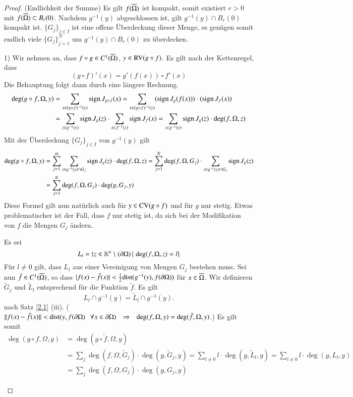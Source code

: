 \begin{proof}
    (Endlichkeit der Summe) Es gilt $f(\overline\Omega)$ ist kompakt, somit existiert $r>0$ mit $f(\overline \Omega)
    \subset B_r(0)$. Nachdem $g^{-1}(y)$ abgeschlossen ist, gilt $g^{-1}(y)\cap B_r(0)$ kompakt ist.
    $\{G_j\}_{j\in I}$ ist eine offene Überdeckung dieser Menge, es genügen somit endlich viele $\{  
    G_j \}_{j=1}^N$ um $g^{-1}(y)\cap B_r(0)$ zu überdecken.
    \begin{description}
    \item{1)}
    Wir nehmen an, dass $f\circ g\in C^1(\overline \Omega)$, $y\in \mathrm{RV}(g\circ f)$. Es gilt nach der
    Kettenregel, dass
    \[
        (g\circ f)'(x)=g'(f(x))\circ f'(x)
    \]
    Die Behauptung folgt dann durch eine längere Rechnung.
    \begin{align*}
        \deg(g\circ f,\Omega,y)&=\sum_{x\in(g\circ f)^{-1}(y)}\mathrm{sign}\, J_{g\circ f}(x)=\sum_{x\in (g\circ f)
        ^{-1} (y)}(\mathrm{sign}\, J_g(f(x)))\cdot(\mathrm{sign}\, J_f(x))\\
        &= \sum_{z\in g^{-1}(y)} \mathrm{sign}\, J_g(z)\cdot \sum_{x\in f^{-1}(z)} \mathrm{sign}\, J_f(x)
        =\sum_{z\in g^{-1}(y)} \mathrm{sign}\, J_g(z)\cdot \deg(f,\Omega,z)
    \end{align*}
    Mit der Überdeckung $\{G_j\}_{j\in I}$ von $g^{-1}(y)$ gilt
    \begin{align*}
        \deg(g\circ f,\Omega,y)&=\sum_{j=1}^m\sum_{z\in g^{-1}(y)\cap G_j}\mathrm{sign}\, J_g(z)\cdot \deg(f,\Omega,z)
        =\sum_{j=1}^N \deg(f,\Omega,G_j) \cdot \sum_{z\in g^{-1}(y)\cap G_j} \mathrm{sign}\, J_g(z)\\
        &= \sum_{j=1}^N \deg(f,\Omega,G_j)\cdot \deg(g,G_j,y)
    \end{align*}
    Diese Formel gilt nun natürlich auch für $y\in \mathrm{CV}(g\circ f)$ und für $g$ nur stetig. Etwas
    problematischer ist der Fall, dass $f$ nur stetig ist, da sich bei der Modifikation von $f$ die
    Mengen $G_j$ ändern.

    Es sei
    \[
        L_l=\{z\in \mathbb{R}^n\setminus(\partial \Omega)\, | \, \deg(f,\Omega,z)=l\}
    \]
    Für $l\neq 0$ gilt, dass $L_l$ aus einer Vereinigung von Mengen $G_j$ bestehen muss. Sei nun
    $\tilde f\in C^1 (\overline \Omega)$, so dass $|f(x)-\tilde f(x)|< \frac 12 \mathrm{dist}(g^{-1}(y),
    f(\partial\Omega))$ für $x\in \overline \Omega$. Wir definieren $\tilde G_j$ und $\tilde L_l$ entsprechend
    für die Funktion $\tilde f$.
    Es gilt
    \[
        L_l\cap g^{-1}(y)=\tilde L_l\cap g^{-1}(y).
    \]
    nach Satz \ref{2.1} (iii). ($\|f(x)-\tilde f(x)\|<\mathrm{dist}(y,f(\partial \Omega)\hspace{.25cm} \forall
    x\in \partial \Omega)\hspace{.25cm} \Rightarrow \hspace{.25cm} \deg(f,\Omega,y)=\deg(\tilde f,\Omega,y)$.) Es gilt somit
    \begin{align*}
        \deg(g\circ f, \Omega, y)&=\deg(g\circ\tilde f,\Omega,y)\\
        &=\sum_{j}\deg(f,\Omega,\tilde G_j)\cdot \deg(g,\tilde G_j,y)=\sum_{l\neq0} l\cdot\deg( g,\tilde
        L_l,y)=\sum_{l\neq 0} l\cdot \deg(g,L_l,y)\\
        &=\sum_j \deg(f,\Omega,G_j)\cdot \deg(g,G_j,y)
    \end{align*}
    \end{description}
\end{proof}

